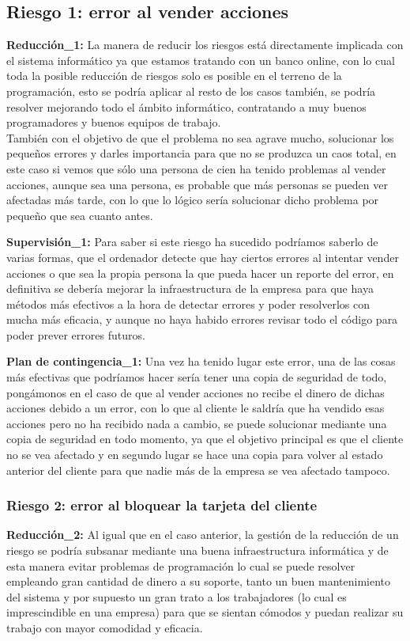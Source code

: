 \subsection{Riesgo 1: error al vender acciones}
\textbf{Reducción\_1:} La manera de reducir los riesgos está directamente implicada con el sistema informático ya que estamos tratando con un banco online, con lo cual toda la posible reducción de riesgos solo es posible en el terreno de la programación, esto se podría aplicar al resto de los casos también, se podría resolver mejorando todo el ámbito informático, contratando a muy buenos programadores y buenos equipos de trabajo.\\
También con el objetivo de que el problema no sea agrave mucho, solucionar los pequeños errores y darles importancia para que no se produzca un caos total, en este caso si vemos que sólo una persona de cien ha tenido problemas al vender acciones, aunque sea una persona, es probable que más personas se pueden ver afectadas más tarde, con lo que lo lógico sería solucionar dicho problema por pequeño que sea cuanto antes.

\textbf{Supervisión\_1:} Para saber si este riesgo ha sucedido podríamos saberlo de varias formas, que el ordenador detecte que hay ciertos errores al intentar vender acciones o que sea la propia persona la que pueda hacer un reporte del error, en definitiva se debería mejorar la infraestructura de la empresa para que haya métodos más efectivos a la hora de detectar errores y poder resolverlos con mucha más eficacia, y aunque no haya habido errores revisar todo el código para poder prever errores futuros.

\textbf{Plan de contingencia\_1:} Una vez ha tenido lugar este error, una de las cosas más efectivas que podríamos hacer sería tener una copia de seguridad de todo, pongámonos en el caso de que al vender acciones no recibe el dinero de dichas acciones debido a un error, con lo que al cliente le saldría que ha vendido esas acciones pero no ha recibido nada a cambio, se puede solucionar mediante una copia de seguridad en todo momento, ya que el objetivo principal es que el cliente no se vea afectado y en segundo lugar se hace una copia para volver al estado anterior del cliente para que nadie más de la empresa se vea afectado tampoco.


\subsubsection{Riesgo 2: error al bloquear la tarjeta del cliente}
\textbf{Reducción\_2:} Al igual que en el caso anterior, la gestión de la reducción de un riesgo se podría subsanar mediante una buena infraestructura informática y de esta manera evitar problemas de programación lo cual se puede resolver empleando gran cantidad de dinero a su soporte, tanto un buen mantenimiento del sistema y por supuesto un gran trato a los trabajadores (lo cual es imprescindible en una empresa) para que se sientan cómodos y puedan realizar su trabajo con mayor comodidad y eficacia.

